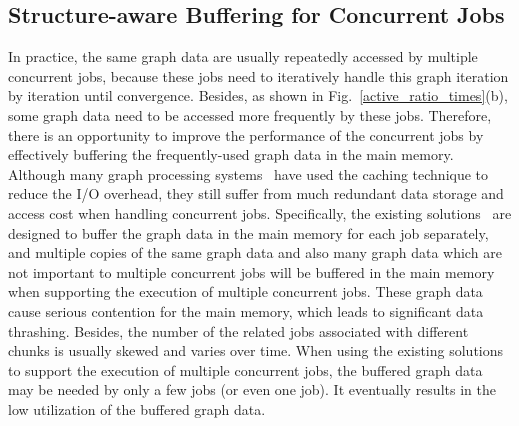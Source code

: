 \documentclass[10pt,journal,compsoc]{IEEEtran}
\begin{document}
\subsection{Structure-aware Buffering for Concurrent Jobs}\label{section:Caching}
\vspace{-2pt}
In practice, the same graph data are usually repeatedly accessed by multiple concurrent jobs, because these jobs need to iteratively handle this graph iteration by iteration until convergence.
Besides, as shown in Fig.~\ref{active_ratio_times}(b), some graph data need to be accessed more frequently by these jobs.
Therefore, there is an opportunity to improve the performance of the concurrent jobs by effectively buffering the frequently-used graph data in the main memory.
Although many graph processing systems~\cite{G-store,FlashGraph,TurboGraph,Wonderland} have used the caching technique to reduce the I/O overhead, they still suffer from much redundant data storage and access cost when handling concurrent jobs. Specifically, the existing solutions~\cite{G-store,FlashGraph,TurboGraph,Wonderland} are designed to buffer the graph data in the main memory for each job separately, and multiple copies of the same graph data and also many graph data which are not important to multiple concurrent jobs will be buffered in the main memory when supporting the execution of multiple concurrent jobs.
These graph data cause serious contention for the main memory, which leads to significant data thrashing. Besides, the number of the related jobs associated with different chunks is usually skewed and varies over time. When using the existing solutions~\cite{G-store,FlashGraph,TurboGraph,Wonderland} to support the execution of multiple concurrent jobs, the buffered graph data may be needed by only a few jobs (or even one job). It eventually results in the low utilization of the buffered graph data.

\end{document}
